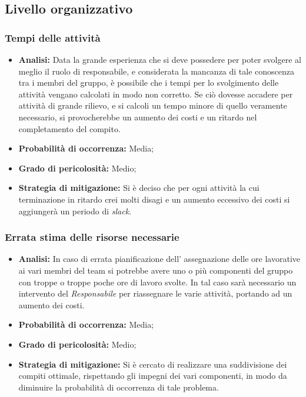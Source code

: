 \subsection{Livello organizzativo}
\subsubsection{Tempi delle attività}
	\begin{itemize}
	\item \textbf{Analisi: }Data la grande esperienza che si deve possedere per poter svolgere al meglio il ruolo di responsabile, e considerata la mancanza di tale conoscenza tra i membri del gruppo, è possibile che i tempi per lo svolgimento delle attività vengano calcolati in modo non corretto. Se ciò dovesse accadere per attività di grande rilievo, e si calcoli un tempo minore di quello veramente necessario, si provocherebbe un aumento dei costi e un ritardo nel completamento del compito.
	\item \textbf{Probabilità di occorrenza:} Media;
	\item \textbf{Grado di pericolosità:} Medio;
	\item \textbf{Strategia di mitigazione: }Si è deciso che per ogni attività la cui terminazione in ritardo crei molti disagi e un aumento eccessivo dei costi si aggiungerà un periodo di \textit{slack}.
	\end{itemize}
\subsubsection{Errata stima delle risorse necessarie}
	\begin{itemize}
	\item \textbf{Analisi: }In caso di errata pianificazione dell' assegnazione delle ore lavorative ai vari membri del team si potrebbe avere uno o più componenti del gruppo con troppe o troppe poche ore di lavoro svolte. In tal caso sarà necessario un intervento del \textit{Responsabile} per riassegnare le varie attività, portando ad un aumento dei costi.
	\item \textbf{Probabilità di occorrenza:} Media;
	\item \textbf{Grado di pericolosità:} Medio;
	\item \textbf{Strategia di mitigazione: }Si è cercato di realizzare una suddivisione dei compiti ottimale, rispettando gli impegni dei vari componenti, in modo da diminuire la probabilità di occorrenza di tale problema.
	\end{itemize}
